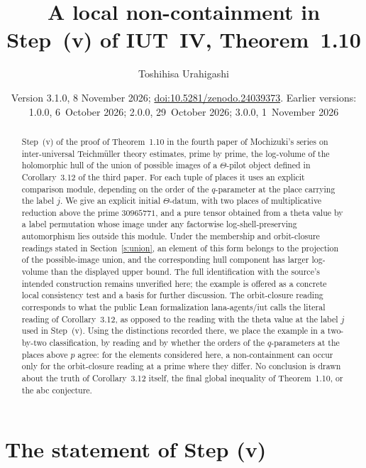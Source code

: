 \documentclass[11pt]{amsart}
\theoremstyle{remark}
\begin{document}
\title{A local non-containment in Step~(v) of IUT~IV, Theorem~1.10}
\author{Toshihisa Urahigashi}
\date{Version 3.1.0, 8 November 2026; \href{https://doi.org/10.5281/zenodo.24039373}{doi:10.5281/zenodo.24039373}. Earlier versions:
  1.0.0, 6~October 2026; 2.0.0, 29~October 2026; 3.0.0, 1~November 2026}

\begin{abstract}
Step~(v) of the proof of Theorem~1.10 in the fourth paper of Mochizuki's series on inter-universal
Teichm\"uller theory estimates, prime by prime, the log-volume of the holomorphic hull of the union of
possible images of a $\Theta$-pilot object defined in Corollary~3.12 of the third paper. For each tuple of
places it uses an explicit comparison module, depending on the order of the $q$-parameter at the place
carrying the label $j$. We give an explicit initial $\Theta$-datum, with two places of multiplicative
reduction above the prime $30965771$, and a pure tensor obtained from a theta value by a label permutation
whose image under any factorwise log-shell-preserving automorphism lies outside this module.
Under the membership and orbit-closure readings stated in Section~\ref{s:union}, an element of this form
belongs to the projection of the possible-image union, and the corresponding hull component has
larger log-volume than the displayed upper bound. The full identification with the source's intended
construction remains unverified here; the example is offered as a concrete local consistency test
and a basis for further discussion. The orbit-closure reading corresponds to what the public Lean
formalization lana-agents/iut calls the literal reading of Corollary~3.12, as opposed to the reading with
the theta value at the label $j$ used in Step~(v). Using the distinctions recorded there, we place the example
in a two-by-two classification,
by reading and by whether the orders of the $q$-parameters at the places above $p$ agree: for the
elements considered here, a non-containment can occur only for the orbit-closure reading at a prime where
they differ. No conclusion is drawn about the truth of Corollary~3.12 itself,
the final global inequality of Theorem~1.10, or the abc conjecture.
\end{abstract}

\maketitle

\section{The statement of Step (v)}\label{s:source}
\end{document}
